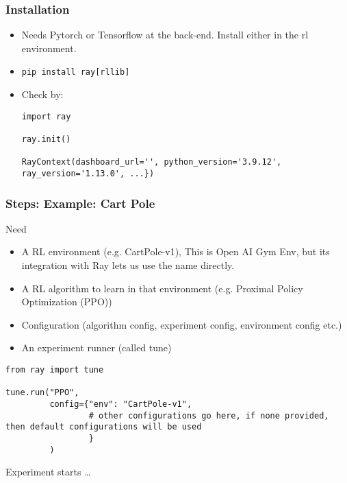 \begin{frame}[fragile]\frametitle{Installation}
\begin{itemize}
\item Needs Pytorch or Tensorflow at the back-end. Install either in the rl environment.
\item \lstinline|pip install ray[rllib]|
\item  Check by:

\begin{lstlisting}
import ray

ray.init()

RayContext(dashboard_url='', python_version='3.9.12', ray_version='1.13.0', ...})
\end{lstlisting}
\end{itemize}
\end{frame}

\begin{frame}[fragile]\frametitle{Steps: Example: Cart Pole}
Need 
\begin{itemize}
\item A RL environment (e.g. CartPole-v1), This is Open AI Gym Env, but its integration with Ray lets us use the name directly.
\item A RL algorithm to learn in that environment (e.g. Proximal Policy Optimization (PPO))
\item Configuration (algorithm config, experiment config, environment config etc.)
\item An experiment runner (called tune)
\end{itemize}

\begin{lstlisting}
from ray import tune

tune.run("PPO",
         config={"env": "CartPole-v1",
                 # other configurations go here, if none provided, then default configurations will be used
                 }
         )
\end{lstlisting}

Experiment starts \ldots
\end{frame}

